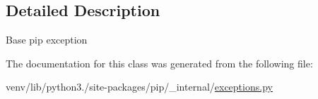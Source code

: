 \subsection{Detailed Description}
\begin{DoxyVerb}Base pip exception\end{DoxyVerb}
 

The documentation for this class was generated from the following file\+:\begin{DoxyCompactItemize}
\item 
venv/lib/python3./site-\/packages/pip/\+\_\+internal/\hyperlink{pip_2__internal_2exceptions_8py}{exceptions.\+py}\end{DoxyCompactItemize}
